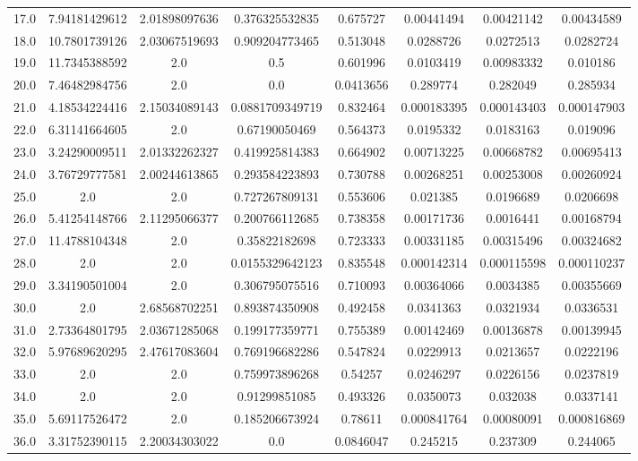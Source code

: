 \begin{longtable}{|c|c|c|c|c|c|c|c|}
17.0 & 7.94181429612 & 2.01898097636 & 0.376325532835 & 0.675727 & 0.00441494 & 0.00421142 & 0.00434589 \\
18.0 & 10.7801739126 & 2.03067519693 & 0.909204773465 & 0.513048 & 0.0288726 & 0.0272513 & 0.0282724 \\
19.0 & 11.7345388592 & 2.0 & 0.5 & 0.601996 & 0.0103419 & 0.00983332 & 0.010186 \\
20.0 & 7.46482984756 & 2.0 & 0.0 & 0.0413656 & 0.289774 & 0.282049 & 0.285934 \\
21.0 & 4.18534224416 & 2.15034089143 & 0.0881709349719 & 0.832464 & 0.000183395 & 0.000143403 & 0.000147903 \\
22.0 & 6.31141664605 & 2.0 & 0.67190050469 & 0.564373 & 0.0195332 & 0.0183163 & 0.019096 \\
23.0 & 3.24290009511 & 2.01332262327 & 0.419925814383 & 0.664902 & 0.00713225 & 0.00668782 & 0.00695413 \\
24.0 & 3.76729777581 & 2.00244613865 & 0.293584223893 & 0.730788 & 0.00268251 & 0.00253008 & 0.00260924 \\
25.0 & 2.0 & 2.0 & 0.727267809131 & 0.553606 & 0.021385 & 0.0196689 & 0.0206698 \\
26.0 & 5.41254148766 & 2.11295066377 & 0.200766112685 & 0.738358 & 0.00171736 & 0.0016441 & 0.00168794 \\
27.0 & 11.4788104348 & 2.0 & 0.35822182698 & 0.723333 & 0.00331185 & 0.00315496 & 0.00324682 \\
28.0 & 2.0 & 2.0 & 0.0155329642123 & 0.835548 & 0.000142314 & 0.000115598 & 0.000110237 \\
29.0 & 3.34190501004 & 2.0 & 0.306795075516 & 0.710093 & 0.00364066 & 0.0034385 & 0.00355669 \\
30.0 & 2.0 & 2.68568702251 & 0.893874350908 & 0.492458 & 0.0341363 & 0.0321934 & 0.0336531 \\
31.0 & 2.73364801795 & 2.03671285068 & 0.199177359771 & 0.755389 & 0.00142469 & 0.00136878 & 0.00139945 \\
32.0 & 5.97689620295 & 2.47617083604 & 0.769196682286 & 0.547824 & 0.0229913 & 0.0213657 & 0.0222196 \\
33.0 & 2.0 & 2.0 & 0.759973896268 & 0.54257 & 0.0246297 & 0.0226156 & 0.0237819 \\
34.0 & 2.0 & 2.0 & 0.91299851085 & 0.493326 & 0.0350073 & 0.032038 & 0.0337141 \\
35.0 & 5.69117526472 & 2.0 & 0.185206673924 & 0.78611 & 0.000841764 & 0.00080091 & 0.000816869 \\
36.0 & 3.31752390115 & 2.20034303022 & 0.0 & 0.0846047 & 0.245215 & 0.237309 & 0.244065 \\

\end{longtable}
